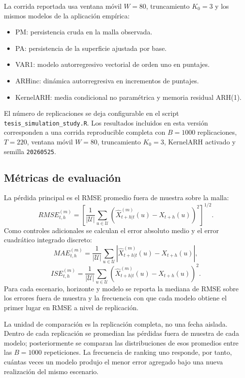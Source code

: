 \documentclass[a4paper,11pt]{article}
\begin{document}
La corrida reportada usa ventana móvil \(W=80\), truncamiento \(K_0=3\) y los mismos modelos de la aplicación empírica:
\begin{itemize}
  \item PM: persistencia cruda en la malla observada.
  \item PA: persistencia de la superficie ajustada por base.
  \item VAR1: modelo autorregresivo vectorial de orden uno en puntajes.
  \item ARHinc: dinámica autorregresiva en incrementos de puntajes.
  \item KernelARH: media condicional no paramétrica y memoria residual ARH(1).
\end{itemize}

El número de replicaciones se deja configurable en el script \texttt{tesis\_simulation\_study.R}. Los resultados incluidos en esta versión corresponden a una corrida reproducible completa con \(B=1000\) replicaciones, \(T=220\), ventana móvil \(W=80\), truncamiento \(K_0=3\), KernelARH activado y semilla \texttt{20260525}.

\subsection{Métricas de evaluación}

La pérdida principal es el RMSE promedio fuera de muestra sobre la malla:
\[
  RMSE_{t,h}^{(m)}
  =
  \left[
  \frac{1}{|\mathcal{U}|}
  \sum_{u\in\mathcal{U}}
  \left(
  \widehat X_{t+h|t}^{(m)}(u)-X_{t+h}(u)
  \right)^2
  \right]^{1/2}.
\]
Como controles adicionales se calculan el error absoluto medio y el error cuadrático integrado discreto:
\[
  MAE_{t,h}^{(m)}
  =
  \frac{1}{|\mathcal{U}|}
  \sum_{u\in\mathcal{U}}
  \left|
  \widehat X_{t+h|t}^{(m)}(u)-X_{t+h}(u)
  \right|,
\]
\[
  ISE_{t,h}^{(m)}
  =
  \frac{1}{|\mathcal{U}|}
  \sum_{u\in\mathcal{U}}
  \left(
  \widehat X_{t+h|t}^{(m)}(u)-X_{t+h}(u)
  \right)^2.
\]
Para cada escenario, horizonte y modelo se reporta la mediana de RMSE sobre los errores fuera de muestra y la frecuencia con que cada modelo obtiene el primer lugar en RMSE a nivel de replicación.

La unidad de comparación es la replicación completa, no una fecha aislada. Dentro de cada replicación se promedian las pérdidas fuera de muestra de cada modelo; posteriormente se comparan las distribuciones de esos promedios entre las \(B=1000\) repeticiones. La frecuencia de ranking uno responde, por tanto, cuántas veces un modelo produjo el menor error agregado bajo una nueva realización del mismo escenario.
\end{document}
